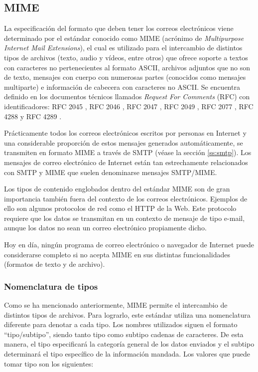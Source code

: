 \subsection{MIME}\label{ss:mime}
La especificación del formato que deben tener los correos electrónicos viene determinado por el estándar conocido como MIME (acrónimo de \textit{Multipurpose Internet Mail Extensions}), el cual es utilizado para el intercambio de distintos tipos de archivos (texto, audio y vídeos, entre otros) que ofrece soporte a textos con caracteres no pertenecientes al formato ASCII, archivos adjuntos que no son de texto, mensajes con cuerpo con numerosas partes (conocidos como mensajes multiparte) e información de cabecera con caracteres no ASCII. Se encuentra definido en los documentos técnicos llamados \textit{Request For Comments} (RFC) con identificadores: RFC 2045 \citep{rfc2045}, RFC 2046 \citep{rfc2046}, RFC 2047 \citep{rfc2047}, RFC 2049 \citep{rfc2049}, RFC 2077 \citep{rfc2077}, RFC 4288 \citep{rfc4288} y RFC 4289 \citep{rfc4289}.

Prácticamente todos los correos electrónicos escritos por personas en Internet y una considerable proporción de estos mensajes generados automáticamente, se transmiten en formato MIME a través de SMTP (véase la sección \ref{ss:smtp}). Los mensajes de correo electrónico de Internet están tan estrechamente relacionados con SMTP y MIME que suelen denominarse mensajes SMTP/MIME.

Los tipos de contenido englobados dentro del estándar MIME son de gran importancia también fuera del contexto de los correos electrónicos. Ejemplos de ello son algunos protocolos de red como el HTTP de la Web. Este protocolo requiere que los datos se transmitan en un contexto de mensaje de tipo e-mail, aunque los datos no sean un correo electrónico propiamente dicho.

Hoy en día, ningún programa de correo electrónico o navegador de Internet puede considerarse completo si no acepta MIME en sus distintas funcionalidades (formatos de texto y de archivo).

\subsubsection{Nomenclatura de tipos}\label{sss:mimetipos}
Como se ha mencionado anteriormente, MIME permite el intercambio de distintos tipos de archivos. Para lograrlo, este estándar utiliza una nomenclatura diferente para denotar a cada tipo. Los nombres utilizados siguen el formato ``tipo/subtipo'', siendo tanto tipo como subtipo cadenas de caracteres. De esta manera, el tipo especificará la categoría general de los datos enviados y el subtipo determinará el tipo específico de la información mandada. Los valores que puede tomar tipo son los siguientes:

